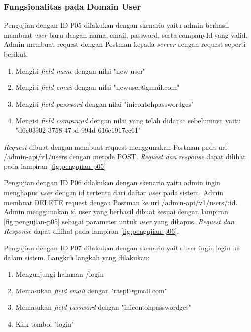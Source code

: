 \subsubsection{Fungsionalitas pada Domain User}

Pengujian dengan ID P05 dilakukan dengan skenario yaitu admin berhasil membuat \textit{user} baru dengan nama, email, password, serta companyId yang valid. Admin membuat request dengan Postman kepada \textit{server} dengan request seperti berikut.

\begin{enumerate}
  \item Mengisi \textit{field name} dengan nilai "new user"
  \item Mengisi \textit{field email} dengan nilai "newuser@gmail.com"
  \item Mengisi \textit{field password} dengan nilai "inicontohpasswordges"
  \item Mengisi \textit{field company\textunderscore id} dengan nilai yang telah didapat sebelumnya yaitu "d6c03902-3758-47bd-994d-616e1917cc61"
\end{enumerate}

\textit{Request} dibuat dengan membuat request menggunakan Postman pada url /admin-api/v1/users dengan metode POST. \textit{Request dan response} dapat dilihat pada lampiran \ref{fig:pengujian-p05}

Pengujian dengan ID P06 dilakukan dengan skenario yaitu admin ingin menghapus \textit{user} dengan id tertentu dari daftar \textit{user} pada sistem. Admin membuat DELETE request dengan Postman ke url /admin-api/v1/users/:id. Admin menggunakan id user yang berhasil dibuat sesuai dengan lampiran \ref{fig:pengujian-p05} sebagai parameter untuk \textit{user} yang dihapus. \textit{Request dan Response} dapat dilihat pada lampiran \ref{fig:pengujian-p06}.

Pengujian dengan ID P07 dilakukan dengan skenario yaitu user ingin login ke dalam sistem. Langkah langkah yang dilakukan:

\begin{enumerate}
  \item Mengunjungi halaman /login
  \item Memasukan \textit{field email} dengan "raspi@gmail.com"
  \item Memasukan \textit{field password} dengan "inicontohpasswordges"
  \item Kilk tombol "login"
\end{enumerate}


